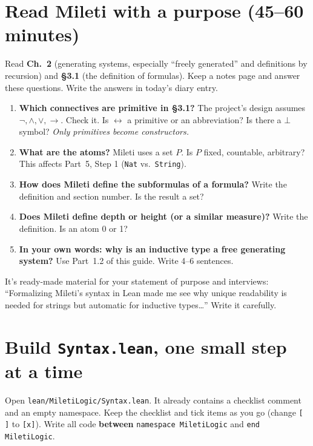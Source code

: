 \documentclass[11pt,a4paper]{article}
\newcommand{\code}[1]{\texttt{#1}}
\begin{document}
\section{Read Mileti with a purpose (45--60 minutes)}
Read \textbf{Ch.~2} (generating systems, especially ``freely generated'' and definitions by recursion) and \textbf{§3.1} (the definition of formulas). Keep a notes page and answer these questions. Write the answers in today's diary entry.

\begin{enumerate}[leftmargin=*]
\item \textbf{Which connectives are primitive in §3.1?} The project's design assumes $\neg,\wedge,\vee,\to$. Check it. Is $\leftrightarrow$ a primitive or an abbreviation? Is there a $\bot$ symbol? \emph{Only primitives become constructors.}
\item \textbf{What are the atoms?} Mileti uses a set $P$. Is $P$ fixed, countable, arbitrary? This affects Part~5, Step 1 (\code{Nat} vs.\ \code{String}).
\item \textbf{How does Mileti define the subformulas of a formula?} Write the definition and section number. Is the result a set?
\item \textbf{Does Mileti define depth or height (or a similar measure)?} Write the definition. Is an atom 0 or 1?
\item \textbf{In your own words: why is an inductive type a free generating system?} Use Part~1.2 of this guide. Write 4--6 sentences.
\end{enumerate}
\begin{tip}
It's ready-made material for your statement of purpose and interviews: ``Formalizing Mileti's syntax in Lean made me see why unique readability is needed for strings but automatic for inductive types…'' Write it carefully.
\end{tip}

\section{Build \texttt{Syntax.lean}, one small step at a time}
Open \code{lean/MiletiLogic/Syntax.lean}. It already contains a checklist comment and an empty namespace. Keep the checklist and tick items as you go (change \code{[ ]} to \code{[x]}). Write all code \textbf{between} \code{namespace MiletiLogic} and \code{end MiletiLogic}.
\end{document}
